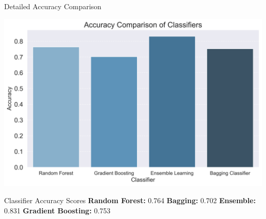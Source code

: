 \begin{frame}{Detailed Accuracy Comparison}
	\begin{center}
		\includegraphics[width=0.5\linewidth]{images/paper_1/accuracy_comparison}
		
		\vspace{0.5em}


	\end{center}
	
	\vspace{1em}
	\begin{block}{Classifier Accuracy Scores}
		\small \textbf{Random Forest:} 0.764 \quad \textbf{Bagging:} 0.702 \quad \textbf{Ensemble:} 0.831 \quad \textbf{Gradient Boosting:} 0.753
	\end{block}
		
\end{frame}








